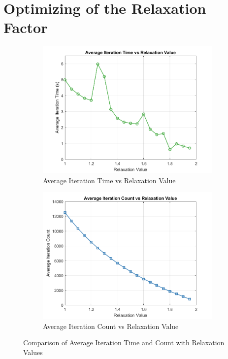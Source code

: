 \section{Optimizing of the Relaxation Factor}
\label{Sec: Optimizing Relaxation Factor}

\begin{figure}[H]
    \centering
    \begin{subfigure}[b]{0.49\linewidth}
        \centering
        \includegraphics[width=\linewidth]{figures/overrelaxation/average_iteration_time_vs_relaxation_value.png}
        \caption{Average Iteration Time vs Relaxation Value}
        \label{fig:average_iteration_time}
    \end{subfigure}
    \hfill
    \begin{subfigure}[b]{0.49\linewidth}
        \centering
        \includegraphics[width=\linewidth]{figures/overrelaxation/average_iteration_count_vs_relaxation_value.png}
        \caption{Average Iteration Count vs Relaxation Value}
        \label{fig:average_iteration_count}
    \end{subfigure}
    \caption{Comparison of Average Iteration Time and Count with Relaxation Values}
    \label{fig:comparison}
\end{figure}
